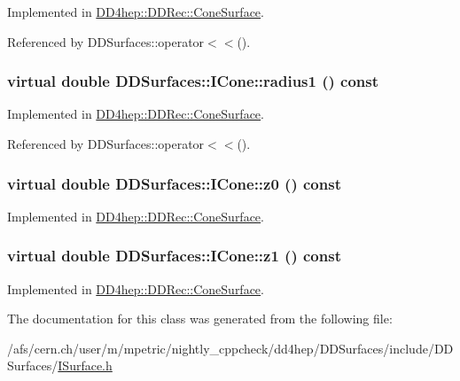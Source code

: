 Implemented in \hyperlink{class_d_d4hep_1_1_d_d_rec_1_1_cone_surface_afd2818bb0856bcc8bcf4dc8f13021487}{DD4hep::DDRec::ConeSurface}.

Referenced by DDSurfaces::operator$<$$<$().\hypertarget{class_d_d_surfaces_1_1_i_cone_a58fb9fc961cc2580a6cc1d5fda4d817e}{
\subsubsection[{radius1}]{\setlength{\rightskip}{0pt plus 5cm}virtual double DDSurfaces::ICone::radius1 () const}}
\label{class_d_d_surfaces_1_1_i_cone_a58fb9fc961cc2580a6cc1d5fda4d817e}


Implemented in \hyperlink{class_d_d4hep_1_1_d_d_rec_1_1_cone_surface_a06f5fb8f4f87c1adbe0c50f26c41a7ad}{DD4hep::DDRec::ConeSurface}.

Referenced by DDSurfaces::operator$<$$<$().\hypertarget{class_d_d_surfaces_1_1_i_cone_a306dd8443c146ce57ebf98f7f5c11013}{
\subsubsection[{z0}]{\setlength{\rightskip}{0pt plus 5cm}virtual double DDSurfaces::ICone::z0 () const}}
\label{class_d_d_surfaces_1_1_i_cone_a306dd8443c146ce57ebf98f7f5c11013}


Implemented in \hyperlink{class_d_d4hep_1_1_d_d_rec_1_1_cone_surface_a208dd6edd7dafbb3bbfd7208f5e54d77}{DD4hep::DDRec::ConeSurface}.\hypertarget{class_d_d_surfaces_1_1_i_cone_a7bb86876e5f5196ea11ac78bcaa42dbc}{
\subsubsection[{z1}]{\setlength{\rightskip}{0pt plus 5cm}virtual double DDSurfaces::ICone::z1 () const}}
\label{class_d_d_surfaces_1_1_i_cone_a7bb86876e5f5196ea11ac78bcaa42dbc}


Implemented in \hyperlink{class_d_d4hep_1_1_d_d_rec_1_1_cone_surface_a57025cbc8425945bffdca2ded15530bf}{DD4hep::DDRec::ConeSurface}.

The documentation for this class was generated from the following file:\begin{DoxyCompactItemize}
\item 
/afs/cern.ch/user/m/mpetric/nightly\_\-cppcheck/dd4hep/DDSurfaces/include/DDSurfaces/\hyperlink{_i_surface_8h}{ISurface.h}\end{DoxyCompactItemize}
